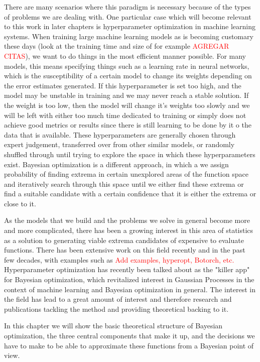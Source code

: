 There are many scenarios where this paradigm is necessary because of the types of problems we are dealing with. One particular case which will become relevant to this work in later chapters is hyperparameter optimization in machine learning systems. When training large machine learning models as is becoming customary these days (look at the training time and size of for example \textcolor{red}{AGREGAR CITAS}), we want to do things in the most efficient manner possible. For many models, this means specifying things such as a learning rate in neural networks, which is the susceptibility of a certain model to change its weights depending on the error estimates generated. If this hyperparameter is set too high, and the model may be unstable in training and we may never reach a stable solution. If the weight is too low, then the model will change it's weights too slowly and we will be left with either too much time dedicated to training or simply does not achieve good metrics or results since there is still learning to be done by it o the data that is available. These hyperparameters are generally chosen through expert judgement, transferred over from other similar models, or randomly shuffled through until trying to explore the space in which these hyperparameters exist. Bayesian optimization is a different approach, in which a we assign probability of finding extrema in certain unexplored areas of the function space and iteratively search through this space until we either find these extrema or find a suitable candidate with a certain confidence that it is either the extrema or close to it. 

As the models that we build and the problems we solve in general become more and more complicated, there has been a growing interest in this area of statistics as a solution to generating viable extrema candidates of expensive to evaluate functions. There has been extensive work on this field recently and in the past few decades, with examples such as \textcolor{red}{Add examples, hyperopt, Botorch, etc.} Hyperparameter optimization has recently been talked about as the "killer app" for Bayesian optimization, which revitalized interest in Gaussian Processes in the context of machine learning and Bayesian optimization in general. The interest in the field has lead to a great amount of interest and therefore research and publications tackling the method and providing theoretical backing to it. 

In this chapter we will show the basic theoretical structure of Bayesian optimization, the three central components that make it up, and the decisions we have to make to be able to approximate these functions from a Bayesian point of view. 


